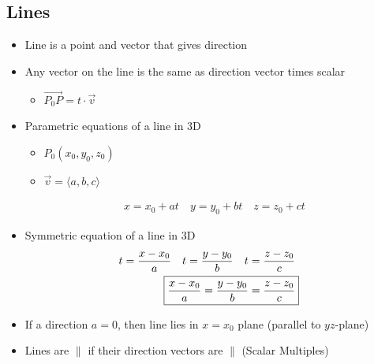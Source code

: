 \documentclass{article}
\begin{document}
\subsection{Lines}
\begin{itemize}
\item Line is a point and vector that gives direction
\item Any vector on the line is the same as direction vector times scalar
  \begin{itemize}
  \item $\vec{P_0P} = t\cdot\vec{v}$
  \end{itemize}
\item Parametric equations of a line in 3D
  \begin{itemize}
  \item $P_0(x_0, y_0, z_0)$
  \item $\vec{v} = \langle a, b, c \rangle$
  \end{itemize}
  \begin{align} 
    x = x_0 + at \quad y = y_0 + bt \quad z = z_0 + ct \label{line-parametric}
  \end{align}
\item Symmetric equation of a line in 3D
  \begin{align}
    \begin{split}
      t = \frac{x-x_0}{a} \quad t = \frac{y-y_0}{b} \quad t = \frac{z-z_0}{c} \\
      \Aboxed{
      \frac{x-x_0}{a} = \frac{y-y_0}{b} = \frac{z-z_0}{c}
      }
    \end{split}
  \end{align}
\item If a direction $a = 0$, then line lies in $x = x_0$ plane (parallel to $yz$-plane)
  \item Lines are $\parallel$ if their direction vectors are $\parallel$ (Scalar Multiples)
\end{itemize}
\end{document}
